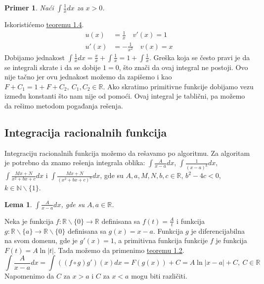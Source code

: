 \documentclass{article}
\newtheorem{lema}{Lema}[section]
\newtheorem{prim}{Primer}[section]
\begin{document}
\begin{primbox}
    \begin{prim}
        Naći $\int \frac{1}{x} dx$ za $x > 0$.
    \end{prim}
    Iskoristićemo \hyperref[teorema_1.4]{teoremu 1.4}.
    \begin{align*}
        u(x)  & = \frac{1}{x}\quad v'(x)   = 1 \\
        u'(x) & = -\frac{1}{x^2}\quad v(x) = x
    \end{align*}
    Dobijamo jednakost $\int \frac{1}{x} dx = \frac{x}{x} + \int \frac{1}{x} = 1+ \int\frac{1}{x}$. Greška koja se
    često pravi je da se integrali skrate i da se dobije $1 = 0$, što znači da ovaj integral ne postoji.
    Ovo nije tačno jer ovu jednakost možemo da zapišemo i kao $F+C_1 = 1+F+C_2,\ C_1,C_2\in\mathbb{R}$.
    Ako skratimo primitivne funkcije dobijamo vezu između konstanti što nam nije od pomoći. Ovaj integral
    je tablični, pa možemo da rešimo metodom pogađanja rešenja.
\end{primbox}

\subsection{Integracija racionalnih funkcija}
Integraciju racionalnih funkcija možemo da rešavamo po algoritmu.
Za algoritam je potrebno da znamo rešenja integrala oblika:
$\int \frac{A}{x-a}dx$, $\int\frac{1}{(x-a)^k}dx$,
$\int \frac{Mx+N}{x^2+bx + c}dx$ i $\int \frac{Mx + N}{(x^2 + bx + c)^n}dx$,
gde su $A,a,M,N,b,c\in\mathbb{R}$, $b^2-4c<0$, $k\in\mathbb{N}\backslash\{1\}$.\par

\begin{lemabox}
    \begin{lema}
        $\int \frac{A}{x-a}dx$, gde su $A,a\in \mathbb{R}$.
    \end{lema}
    Neka je funkcija $f:\mathbb{R}\backslash\{0\}\rightarrow\mathbb{R}$ definisana sa
    $f(t)=\frac{A}{t}$ i funkcija $g:\mathbb{R}\backslash\{a\}\rightarrow\mathbb{R}\backslash\{0\}$
    definisana sa $g(x)=x-a$. Funkcija $g$ je diferencijabilna na svom domenu, gde je $g'(x)=1$, a primitivna funkcija
    funkcije $f$ je funkcija $F(t)=A\ln|t|$. Tada možemo da primenimo \hyperref[teorema_1.2]{teoremu 1.2}.
    \begin{equation*}
        \int \frac{A}{x-a}dx = \int ((f\circ g) g')(x)dx = F(g(x)) + C=A\ln|x-a| + C,\ C\in\mathbb{R}
    \end{equation*}
    Napomenimo da $C$ za $x > a$ i $C$ za $x < a$ mogu biti različiti.
\end{lemabox}
\end{document}
